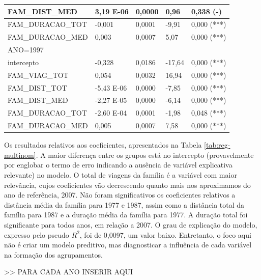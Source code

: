 \begin{table}[htb]
{\begin{tabular}{P{4.00cm} P{2.00cm} P{2.00cm} P{2.00cm} P{2.00cm}}
			\midrule
				FAM_DIST_MED& 
				3,19 E-06&
				0,0000&
				0,96&
		        0,338 (-)\\
			\midrule
				FAM_DURACAO_TOT& 
				-0,001&
				0,0001&
				-9,91&
		        0,000 (***)\\		        		        
			\midrule
				FAM_DURACAO_MED& 
				0,003&
				0,0007&
				5,07&
		        0,000 (***)\\	
			\midrule			
    		    ANO=1997
		    	&
		    	&
		    	&
				\\
			\midrule			
				intercepto& 
		    	-0,328&
		    	0,0186&
		    	-17,64&
				0,000 (***)\\
			\midrule
				FAM_VIAG_TOT& 
				0,054&
				0,0032&
				16,94&
		        0,000 (***)\\
			\midrule
				FAM_DIST_TOT& 
				-5,43 E-06&
				0,0000&
				-7,85&
		        0,000 (***)\\
			\midrule
				FAM_DIST_MED& 
				-2,27 E-05&
				0,0000&
				-6,14&
		        0,000 (***)\\
			\midrule
				FAM_DURACAO_TOT& 
				-2,60 E-04&
				0,0001&
				-1,98&
		        0,048 (***)\\		        		        
			\midrule
				FAM_DURACAO_MED& 
				0,005&
				0,0007&
				7,58&
		        0,000 (***)\\	
			\bottomrule	
		\end{tabular}
    }{%
	}
\end{table}

Os resultados relativos aos coeficientes, apresentados na Tabela \ref{tab:reg-multinom}. A maior diferença entre os grupos está no intercepto (provavelmente por englobar o termo de erro indicando a ausência de variável explicativa relevante) no modelo. 
O total de viagens da família é a variável com maior relevância, cujos coeficientes vão decrescendo quanto mais nos aproximamos do ano de referência, 2007. 
Não foram significativos os coeficientes relativos a distância média da família para 1977 e 1987, assim como a distância total da família para 1987 e a duração média da família para 1977.
A duração total foi significante para todos anos, em relação a 2007.
O grau de explicação do modelo, expresso pelo pseudo $R^2$, foi de 0,0097, um valor baixo. Entretanto, o foco aqui não é criar um modelo preditivo, mas diagnosticar a influência de cada variável na formação dos agrupamentos.

>> PARA CADA ANO INSERIR AQUI

